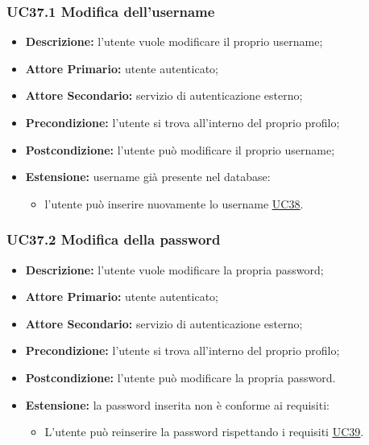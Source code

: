 \subsubsection{UC37.1 Modifica dell'username}
\label{sec:UC37.1}
\begin{itemize}
    \item \textbf{Descrizione:} l'utente vuole modificare il proprio username;
    \item \textbf{Attore Primario:} utente autenticato;
    \item \textbf{Attore Secondario:} servizio di autenticazione esterno;
    \item \textbf{Precondizione:} l'utente si trova all'interno del proprio profilo;
    \item \textbf{Postcondizione:} l'utente può modificare il proprio username;
    \item \textbf{Estensione:} username già presente nel database:
          \begin{itemize}
              \item l'utente può inserire nuovamente lo username \underline{\hyperref[sec:UC38]{UC38}}.
          \end{itemize}
\end{itemize}

\subsubsection{UC37.2 Modifica della password}
\label{sec:UC37.2}
\begin{itemize}
    \item \textbf{Descrizione:} l'utente vuole modificare la propria password;
    \item \textbf{Attore Primario:} utente autenticato;
    \item \textbf{Attore Secondario:} servizio di autenticazione esterno;
    \item \textbf{Precondizione:} l'utente si trova all'interno del proprio profilo;
    \item \textbf{Postcondizione:} l'utente può modificare la propria password.
    \item \textbf{Estensione:} la password inserita non è conforme ai requisiti:
          \begin{itemize}
              \item L'utente può reinserire la password rispettando i requisiti \underline{\hyperref[sec:UC39]{UC39}}.
          \end{itemize}
\end{itemize}